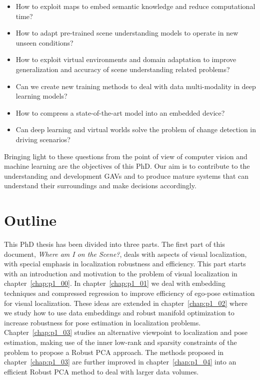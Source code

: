 \begin{itemize}
\item How to exploit maps to embed semantic knowledge and reduce computational time?
\item How to adapt pre-trained scene understanding models to operate in new unseen conditions?
\item How to exploit virtual environments and domain adaptation to improve generalization and accuracy of scene understanding related problems?
\item Can we create new training methods to deal with data multi-modality in deep learning models?
\item How to compress a state-of-the-art model into an embedded device?
\item Can deep learning and virtual worlds solve the problem of change detection in driving scenarios?
\end{itemize}

Bringing light to these questions from the point of view of computer vision and machine learning are the objectives of this PhD. Our aim is to contribute to the understanding and development GAVs and to produce mature systems that can understand their surroundings and make decisions accordingly.

\section{Outline}

This PhD thesis has been divided into three parts. The first part of this document, \textit{Where am I on the Scene?}, deals with aspects of visual localization, with special emphasis in localization robustness and efficiency. This part starts with an introduction and motivation to the problem of visual localization in chapter~\ref{chap:p1_00}. In chapter~\ref{chap:p1_01} we deal with embedding techniques and compressed regression to improve efficiency of ego-pose estimation for visual localization. These ideas are extended in chapter~\ref{chap:p1_02} where we study how to use data embeddings and robust manifold optimization to increase robustness for pose estimation in localization problems. Chapter~\ref{chap:p1_03} studies an alternative viewpoint to localization and pose estimation, making use of the inner low-rank and sparsity constraints of the problem to propose a Robust PCA approach. The methods proposed in chapter~\ref{chap:p1_03} are further improved in chapter~\ref{chap:p1_04} into an efficient Robust PCA method to deal with larger data volumes. 

